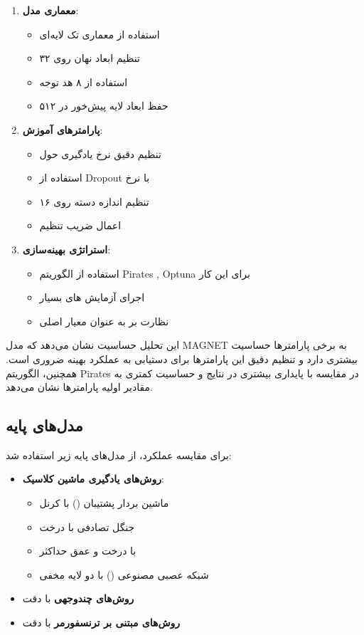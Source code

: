 \begin{enumerate}
    \item \textbf{معماری مدل}:
    \begin{itemize}
        \item استفاده از معماری تک لایه‌ای
        \item تنظیم ابعاد نهان روی ۳۲
        \item استفاده از ۸ هد توجه
        \item حفظ ابعاد لایه پیش‌خور در ۵۱۲
    \end{itemize}
    
    \item \textbf{پارامترهای آموزش}:
    \begin{itemize}
        \item تنظیم دقیق نرخ یادگیری حول 
        \item استفاده از Dropout با نرخ 
        \item تنظیم اندازه دسته روی ۱۶
        \item اعمال ضریب تنظیم 
    \end{itemize}
    
    \item \textbf{استراتژی بهینه‌سازی}:
    \begin{itemize}
        \item استفاده از الگوریتم Pirates , Optuna برای این کار 
        \item اجرای آزمایش های بسیار
        \item نظارت بر  به عنوان معیار اصلی
    \end{itemize}
\end{enumerate}

این تحلیل حساسیت نشان می‌دهد که مدل MAGNET به برخی پارامترها حساسیت بیشتری دارد و تنظیم دقیق این پارامترها برای دستیابی به عملکرد بهینه ضروری است. همچنین، الگوریتم Pirates در مقایسه با  پایداری بیشتری در نتایج و حساسیت کمتری به مقادیر اولیه پارامترها نشان می‌دهد.


\subsection{مدل‌های پایه}
برای مقایسه عملکرد، از مدل‌های پایه زیر استفاده شد:
\begin{itemize}
    \item \textbf{روش‌های یادگیری ماشین کلاسیک}:
    \begin{itemize}
        \item ماشین بردار پشتیبان () با کرنل 
        \item جنگل تصادفی  با  درخت
        \item {} با  درخت و عمق حداکثر 
        \item شبکه عصبی مصنوعی () با دو لایه مخفی
    \end{itemize}
    \item \textbf{روش‌های چندوجهی} با دقت  \cite{Alsaleh2023}
    \item \textbf{روش‌های مبتنی بر ترنسفورمر} با دقت  \cite{TransformerMalware}
\end{itemize}

